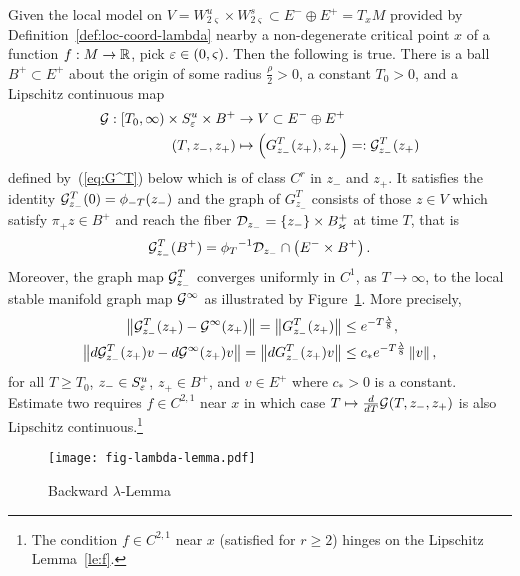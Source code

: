 \documentclass{article}
\begin{document}
\begin{theorem}
\label{thm:backward-lambda-Lemma}
Given the local model on $V=W^u_{2\varsigma}\times W^s_{2\varsigma}\subset E^-\oplus E^+=T_x M$
provided by Definition~\ref{def:loc-coord-lambda} nearby a
non-degenerate critical point $x$ of a function $f:M\to{\mathbb{R}}$,
pick ${\varepsilon}\in(0,\varsigma)$. Then the following is true. There is a ball
$B^+\subset E^+$ about the origin of some radius $\frac{\rho}{2}>0$,
a constant $T_0>0$, and a Lipschitz continuous map
\begin{equation*}
\begin{split}
     {\mathcal{G}}:[T_0,\infty)\times S^u_{\varepsilon}\times B^+
    &\to V\subset E^-\oplus E^+
   \\
     (T,{z_-},z_+)
    &\mapsto 
     \left(G^T_{z_-}(z_+),z_+\right)
     =:{\mathcal{G}}^T_{z_-}(z_+)
\end{split}
\end{equation*}
defined by~(\ref{eq:G^T}) below which is of class $C^r$ in ${z_-}$
and $z_+$. It satisfies the identity ${\mathcal{G}}^T_{z_-}(0)=\phi_{-T}({z_-})$ and the graph
of $G^T_{z_-}$ consists of those $z\in V$ which satisfy $\pi_+ z\in B^+$
and reach the fiber ${\mathcal{D}}_{z_-}=\{{z_-}\}\times B^+_\varkappa$ at time $T$, that is
\begin{equation*}
\begin{split}
     {\mathcal{G}}^T_{z_-}(B^+)
     ={\phi_T}^{-1}{\mathcal{D}}_{z_-}\cap
     \left(E^-\times B^+\right).
\end{split}
\end{equation*}
Moreover, the graph map ${\mathcal{G}}^T_{z_-}$ converges uniformly in $C^1$, as $T\to\infty$,
to the local stable manifold graph map ${\mathcal{G}}^\infty$ as illustrated by Figure~\ref{fig:fig-lambda-Lemma}.
More precisely,
\begin{equation}\label{eq:lin-lam}
\begin{split}
     \bigl\|\Gg^T_{z_-}(z_+)-\Gg^\infty(z_+)\bigr\|=\bigl\|G^T_{z_-}(z_+) \bigr\|
   &\le e^{-T\frac{\lambda}{8}}, \\
     \bigl\|d\Gg^T_{z_-}(z_+)v-d\Gg^\infty(z_+)v \bigr\|=\bigl\|dG^T_{z_-}(z_+)v \bigr\|
   &\le c_* e^{-T\frac{\lambda}{8}}\Norm{v},
\end{split}
\end{equation}
for all $T\ge T_0$, ${z_-}\in S^u_{\varepsilon}$,
$z_+\in B^+$, and $v\in E^+$ where $c_*>0$ is a constant. Estimate two requires
$f\in C^{2,1}$ near $x$ in which case $T\mapsto\frac{d}{dT}{\mathcal{G}}(T,z_-,z_+)$
is also Lipschitz continuous.\footnote{
  The condition $f\in C^{2,1}$ near $x$ (satisfied for $r\ge2$) hinges on the
  Lipschitz Lemma~\ref{le:f}.
  }
\end{theorem}
%
\begin{figure}%
  \centering
  \texttt{[image: fig-lambda-lemma.pdf]}
  \caption{Backward $\lambda$-Lemma}
  \label{fig:fig-lambda-Lemma}
\end{figure}
\end{document}
